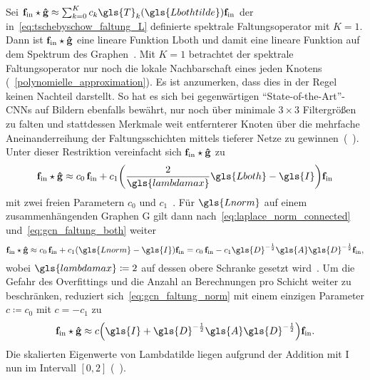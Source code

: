 Sei $\ve{f}_{\mathrm{in}} \star \ve{\hat g} \approx \sum_{k=0}^K c_k \gls{T}_k\left(\gls{Lbothtilde}\right) \ve{f}_{\mathrm{in}}$ der in~\eqref{eq:tschebyschow_faltung_L} definierte spektrale Faltungsoperator mit $K=1$.
Dann ist $\mathbf{f}_{\mathrm{in}} \star \mathbf{\hat g}$ eine lineare Funktion \bzgl{} \gls{Lboth} und damit eine lineare Funktion auf dem Spektrum des Graphen~\cite{gcn}.
Mit $K=1$ betrachtet der spektrale Faltungsoperator nur noch die lokale Nachbarschaft eines jeden Knotens (\vgl{}~\ref{polynomielle_approximation}).
Es ist anzumerken, dass dies in der Regel keinen Nachteil darstellt.
So hat es sich bei gegenwärtigen \enquote{State-of-the-Art}-\glspl{CNN} auf Bildern ebenfalls bewährt, nur noch über minimale $3\times3$ Filtergrößen zu falten und stattdessen Merkmale weit entfernterer Knoten über die mehrfache Aneinanderreihung der Faltungsschichten mittels tieferer Netze zu gewinnen~(\vgl{}~\cite{gcn, vgg, He}).
Unter dieser Restriktion vereinfacht sich $\mathbf{f}_{\mathrm{in}} \star \mathbf{\hat g}$ zu
\begin{equation}
  \ve{f}_{\mathrm{in}} \star \ve{\hat g} \approx c_0\, \ve{f}_{\mathrm{in}} + c_1 \left(\frac{2}{\gls{lambdamax}}\gls{Lboth} - \gls{I}\right)\ve{f}_{\mathrm{in}}
  \label{eq:gcn_faltung_both}
\end{equation}
mit zwei freien Parametern $c_0$ und $c_1$~\cite{gcn}.
Für $\gls{Lnorm}$ auf einem zusammenhängenden Graphen \gls{G} gilt dann nach~\eqref{eq:laplace_norm_connected} und~\eqref{eq:gcn_faltung_both} weiter
\begin{equation}
  \ve{f}_{\mathrm{in}} \star \ve{\hat g} \approx c_0 \, \ve{f}_{\mathrm{in}} + c_1 \left(\gls{Lnorm} - \gls{I}\right)\ve{f}_{\mathrm{in}} = c_0 \, \ve{f}_{\mathrm{in}} - c_1 \gls{D}^{-\frac{1}{2}} \gls{A} \gls{D}^{-\frac{1}{2}} \ve{f}_{\mathrm{in}},
  \label{eq:gcn_faltung_norm}
\end{equation}
wobei $\gls{lambdamax} \coloneqq 2$ auf dessen obere Schranke gesetzt wird~\cite{gcn}.
Um die Gefahr des Overfittings und die Anzahl an Berechnungen pro Schicht weiter zu beschränken, reduziert sich~\eqref{eq:gcn_faltung_norm} mit einem einzigen Parameter $c \coloneqq c_0$ mit $c = -c_1$ zu~\cite{gcn}
\begin{equation*}
  \ve{f}_{\mathrm{in}} \star \ve{\hat g} \approx c \left(\gls{I} + \gls{D}^{-\frac{1}{2}} \gls{A} \gls{D}^{-\frac{1}{2}} \right) \ve{f}_{\mathrm{in}}.
\end{equation*}
Die skalierten Eigenwerte von \gls{Lambdatilde} liegen aufgrund der Addition mit \gls{I} nun im Intervall $\left[0, 2\right]$ (\vgl{}~\cite{gcn}).
